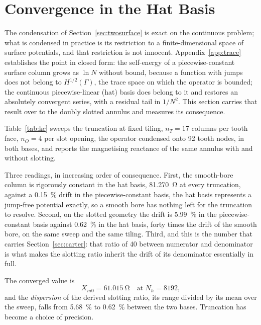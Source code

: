 \documentclass[10pt,a4paper,twocolumn]{article}
\theoremstyle{plain}
\theoremstyle{remark}
\begin{document}
\section{Convergence in the Hat Basis}
\label{sec:p1}

The condensation of Section~\ref{sec:twosurface} is exact on the
continuous problem; what is condensed in practice is its restriction to
a finite-dimensional space of surface potentials, and that restriction
is not innocent. Appendix~\ref{app:trace} establishes the point in
closed form: the self-energy of a piecewise-constant surface column grows as
$\ln N$ without bound, because a function with jumps does not belong to
$H^{1/2}(\Gamma)$, the trace space on which the operator is bounded;
the continuous piecewise-linear (hat) basis does belong to it and
restores an absolutely convergent series, with a residual tail in
$1/N^{2}$. This section carries that result over to the doubly slotted
annulus and measures its consequence.

Table~\ref{tab:kc} sweeps the truncation at fixed tiling, $n_T=17$
columns per tooth face, $n_O=4$ per slot opening, the operator condensed
onto 92 tooth nodes, in both bases, and reports the magnetising
reactance of the same annulus with and without slotting.

Three readings, in increasing order of consequence. First, the
smooth-bore column is rigorously constant in the hat basis,
\SI{81.270}{\ohm} at every truncation, against a \SI{0.15}{\percent}
drift in the piecewise-constant basis, the hat basis represents a
jump-free potential exactly, so a smooth bore has nothing left for the
truncation to resolve. Second, on the slotted geometry the drift is
\SI{5.99}{\percent} in the piecewise-constant basis against
\SI{0.62}{\percent} in the hat basis, forty times the drift of the
smooth bore, on the same sweep and the same tiling. Third, and this is
the number that carries Section~\ref{sec:carter}: that ratio of
\num{40} between numerator and denominator is what makes the slotting
ratio inherit the drift of its denominator essentially in full.

The converged value is
\begin{equation}
X_{m0}=\SI{61.015}{\ohm}\quad\text{at }N_h=\num{8192},
\label{eq:xm0}
\end{equation}
and the \emph{dispersion} of the derived slotting ratio, its range
divided by its mean over the sweep, falls from \SI{5.68}{\percent} to
\SI{0.62}{\percent} between the two bases. Truncation has become a
choice of precision.
\end{document}
